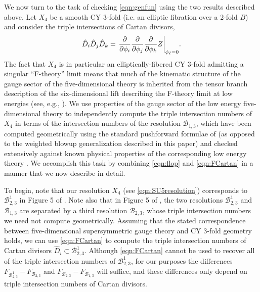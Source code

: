 \documentclass[11pt,oneside,english]{article}
\numberwithin{equation}{section}
\let\originalleft\left
\let\originalright\right
\renewcommand*{\left}{\mathopen{}\mathclose\bgroup\originalleft}
\renewcommand*{\right}{\aftergroup\egroup\originalright}
\theoremstyle{definition}
\begin{document}
We now turn to the task of checking \cref{eqn:genfun} using the two results described above. Let $X_4$ be a smooth CY 3-fold (i.e. an elliptic fibration over a 2-fold $B$) and consider the triple intersections of Cartan divisors,
	\begin{align}
		\hat D_i  \hat D_j  \hat D_k = \left.  \frac{\partial}{\partial \phi_i} \frac{\partial}{\partial \phi_j} \frac{\partial }{\partial \phi_k} Z \right|_{\phi_I =0}.
	\end{align}
The fact that $X_4$ is in particular an elliptically-fibered CY 3-fold admitting a singular ``F-theory'' limit means that much of the kinematic structure of the gauge sector of the five-dimensional theory is inherited from the tensor branch description of the six-dimensional lift describing the F-theory limit at low energies (see, e.g., \cite{Esole:2015xfa}). We use properties of the gauge sector of the low energy five-dimensional theory to independently compute the triple intersection numbers of $X_4$ in terms of the intersection numbers of the resolution $\mathscr B_{1,3}$, which have been computed geometrically using the standard pushforward formulae of \cite{Esole:2017kyr} (as opposed to the weighted blowup generalization described in this paper) and checked extensively against known physical properties of the corresponding low energy theory \cite{Esole:2014hya}.  We accomplish this task by combining \cref{eqn:flop} and \cref{eqn:FCartan} in a manner that we now describe in detail.

To begin, note that our resolution $X_4$ (see \cref{eqn:SU5resolution}) corresponds to $\mathscr B_{2,3}^1$ in Figure 5 of  \cite{Esole:2014hya}.  Note also that in Figure 5 of \cite{Esole:2014hya}, the two resolutions $\mathscr B_{2,3}^{1}$ and $\mathscr B_{1,3}$ are separated by a third resolution $\mathscr B_{2,3}$, whose triple intersection numbers we need not compute geometrically. Assuming that the stated correspondence between five-dimensional supersymmetric gauge theory and CY 3-fold geometry holds, we can use \cref{eqn:FCartan} to compute the triple intersection numbers of Cartan divisors $\hat D_i \subset \mathscr B_{2,3}^1$. Although \cref{eqn:FCartan} cannot be used to recover all of the triple intersection numbers of $\mathscr B_{2,3}^1$, for our purposes the differences $ F_{\mathscr B_{2,3}^1} -  F_{\mathscr B_{2,3}}$ and $ F_{\mathscr B_{2,3}} -  F_{\mathscr B_{1,3}}$ will suffice, and these differences only depend on triple intersection numbers of Cartan divisors. 
\end{document}
